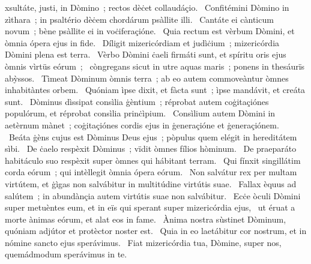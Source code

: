 \psalmChapterWithInscription{}
{ }
{%
xsultáte, justi, in Dòmino~; rectos dèċet collaudáçio. 
~Confitémini Dòmino in zìthara~; in psaltério dèċem chordárum psàllite illi. 
~Cantáte ei cànticum novum~; bène psàllite ei in voċiferaçióne. 
~Quia rectum est vèrbum Dòmini, et òmnia ópera ejus in fide. 
~Díligit mizericórdiam et judìċium~; mizericórdia Dòmini plena est terra. 
~Vèrbo Dòmini ċaeli firmáti sunt, et spíritu oris ejus òmnis vìrtüs eórum~; 
~còngregans sicut in utre aquas maris~; ponens in thesáurïs abỳssos. 
~Tìmeat Dòminum òmnis terra~; ab eo autem commoveàntur òmnes inhabitàntes orbem. 
~Quóniam ìpse dixit, et fàcta sunt~; ìpse mandávit, et creáta sunt. 
~Dòminus dìssipat consìlia ġèntium~; réprobat autem coġitaçiónes populórum, et réprobat consìlia prinċìpium. 
~Consìlium autem Dòmini in aetèrnum mànet~; coġitaçiónes cordis ejus in ġeneraçióne et ġeneraçiónem. 
~Beáta ġèns cujus est Dòminus Deus ejus~; pòpulus quem elégit in hereditátem sìbi. 
~De ċaelo respèxit Dòminus~; vïdit òmnes fílios hòminum. 
~De praeparáto habitáculo suo respèxit super òmnes qui hábitant terram. 
~Qui fínxit singillátim corda eórum~; qui intèllegit òmnia ópera eórum. 
~Non salvátur rex per multam virtútem, et ġìgas non salvábitur in multitúdine virtútis suae. 
~Fallax èquus ad salútem~; in abundànçia autem virtútis suae non salvábitur. 
~Ecċe òculi Dòmini super metuèntes eum, et in eïs qui sperant super mizericórdia ejus, 
~ut éruat a morte ànimas eórum, et alat eos in fame. 
~Ànima nostra sùstinet Dòminum, quóniam adjútor et protèctor noster est. 
~Quia in eo laetábitur cor nostrum, et in nómine sancto ejus sperávimus. 
~Fiat mizericórdia tua, Dòmine, super nos, quemádmodum sperávimus in te. 
}
